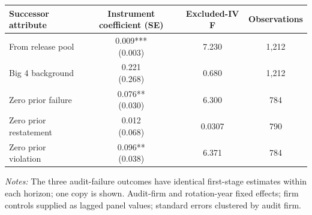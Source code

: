 \documentclass[10pt]{article}
\begin{document}
\begin{minipage}{19cm}\fontsize{10}{12}\selectfont\setlength{\tabcolsep}{4pt}\renewcommand{\arraystretch}{1.12}


\centering
{}
\begin{threeparttable}
\begin{tabular}{p{}ccc}
\toprule
Successor attribute & Instrument coefficient (SE) & Excluded-IV F & Observations \\
\midrule
From release pool & \shortstack{0.009***\\(0.003)} & 7.230 & 1,212 \\
Big 4 background & \shortstack{0.221\\(0.268)} & 0.680 & 1,212 \\
Zero prior failure & \shortstack{0.076**\\(0.030)} & 6.300 & 784 \\
Zero prior restatement & \shortstack{0.012\\(0.068)} & 0.0307 & 790 \\
Zero prior violation & \shortstack{0.096**\\(0.038)} & 6.371 & 784 \\
\bottomrule
\end{tabular}
\begin{tablenotes}\fontsize{9}{11}\selectfont
\item \raggedright \fontsize{9}{11}\selectfont \textit{Notes:} The three audit-failure outcomes have identical first-stage estimates within each horizon; one copy is shown. Audit-firm and rotation-year fixed effects; firm controls supplied as lagged panel values; standard errors clustered by audit firm.
\end{tablenotes}
\end{threeparttable}

\end{minipage}
\end{document}
